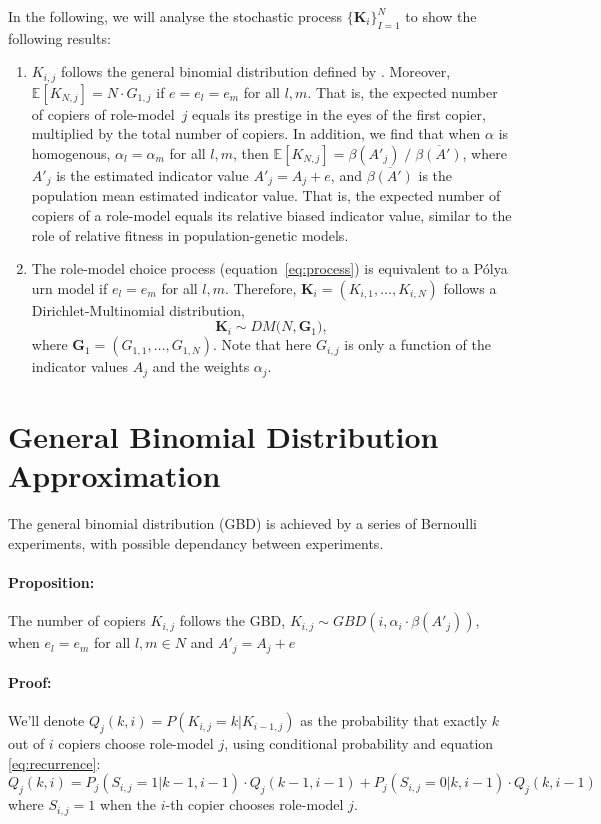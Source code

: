 \documentclass[11pt]{article}
\let\vec\mathbf
\begin{document}
In the following, we will analyse the stochastic process $\{\vec{K}_{i}\}_{I=1}^N$ to show the following results:
\begin{enumerate}
\item 
$K_{i,j}$ follows the general binomial distribution defined by \citep{GBD}.
Moreover, $\mathbb{E}[K_{N,j}] = N \cdot G_{1,j}$ if $e=e_l=e_m$ for all $l,m$.
 That is, the expected number of copiers of role-model~$j$ equals its prestige in the eyes of the first copier, multiplied by the total number of copiers. 
 In addition, we find that when $\alpha$ is homogenous, $\alpha_l=\alpha_m$ for all $l,m$, then $\mathbb{E}[K_{N,j}] = \beta(A'_j) \; / \; \overline{\beta(A') }$, where $A'_j$ is the estimated indicator value $A'_j=A_j+e$, and 
 $\overline{ \beta(A') }$ is the population mean estimated indicator value. 
 That is, the expected number of copiers of a role-model equals its relative biased indicator value, similar to the role of relative fitness in population-genetic models.
\item The role-model choice process (equation~\ref{eq:process}) is equivalent to a P\'{o}lya urn model if $e_l=e_m$ for all $l,m$. 
Therefore, $\vec{K}_i = (K_{i,1}, \ldots, K_{i,N})$ follows a Dirichlet-Multinomial distribution,
\begin{equation}
\vec{K}_i \sim \mathit{DM}\big(N, \vec{G}_1\big), 
\end{equation}
where $\vec{G}_1 = (G_{1,1}, \ldots, G_{1,N})$.
Note that here $G_{i,j}$ is only a function of the indicator values $A_j$ and the weights $\alpha_j$.
\end{enumerate}

\section*{General Binomial Distribution Approximation}
The general binomial distribution (GBD) is achieved by a series of Bernoulli experiments, with possible dependancy between experiments.
\paragraph{Proposition:} The number of copiers $K_{i,j}$ follows the GBD, $K_{i,j} \sim GBD(i,\alpha_i\cdot\beta(A'_j))$, when $e_l=e_m$ for all $l,m \in N$ and $A'_j=A_j + e$ 
\paragraph{Proof: } We'll denote $Q_j(k,i)=P(K_{i,j} = k | K_{i-1,j})$ as the probability that exactly $k$ out of $i$ copiers choose role-model $j$, using conditional probability and equation \ref{eq:recurrence}:
\begin{equation}\label{recursive}
Q_j(k,i) = P_j(S_{i,j}=1 | k-1,i-1) \cdot Q_j(k-1,i-1) + P_j(S_{i,j} =0 | k,i-1) \cdot Q_j(k,i-1)
\end{equation}
where $S_{i,j} =1 $ when the $i$-th copier chooses role-model $j$.
\end{document}
